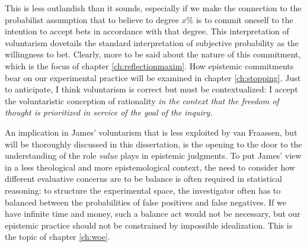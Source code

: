This is less outlandish than it sounds, especially if we make the connection to the probabilist assumption that to believe to degree $x\%$ is to commit oneself to the intention to accept bets in accordance with that degree. This interpretation of voluntarism dovetails the standard interpretation of subjective probability as the willingness to bet. Clearly, more to be said about the nature of this commitment, which is the focus of chapter \ref{ch:reflectionmaxim}. How epistemic commitments bear on our experimental practice will be examined in chapter \ref{ch:stopping}. Just to anticipate, I think voluntarism is correct but must be contextualized: I accept the voluntaristic conception of rationality \emph{in the context that the freedom of thought is prioritized in service of the goal of the inquiry.}  


An implication in  James' voluntarism that is less exploited by van Fraassen, but will be thoroughly discussed in this dissertation, is the opening to the door to the understanding of the role \emph{value} plays in epistemic judgments. To put James' view in a less theological and more epistemological context, the need to consider how different evaluative concerns are to be balance is often required in statistical reasoning: to structure the experimental space, the investigator often has to balanced between the probabilities of false positives and false negatives. If we have infinite time and money, such a balance act would not be necessary, but our epistemic practice should not be constrained by impossible idealization. This is the topic of chapter \ref{ch:woe}.
